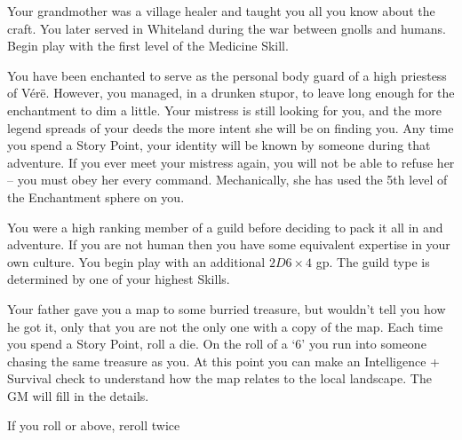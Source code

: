 \begin{multicols}{2}
\begin{list}{\addtocounter{list}{1}\textbf{:}}{\raggedleft}
\item{Your grandmother was a village healer and taught you all you know about the craft. You later served in Whiteland during the war between gnolls and humans.  Begin play with the first level of the Medicine Skill.}

\item{You have been enchanted to serve as the personal body guard of a high priestess of V\'{e}r\"{e}.  However, you managed, in a drunken stupor, to leave long enough for the enchantment to dim a little.  Your mistress is still looking for you, and the more legend spreads of your deeds the more intent she will be on finding you.  Any time you spend a Story Point, your identity will be known by someone during that adventure.  If you ever meet your mistress again, you will not be able to refuse her -- you must obey her every command.  Mechanically, she has used the 5th level of the Enchantment sphere on you.}

\item{You were a high ranking member of a guild before deciding to pack it all in and adventure.  If you are not human then you have some equivalent expertise in your own culture.  You begin play with an additional $2D6\times4$ gp.  The guild type is determined by one of your highest Skills.}

\item{Your father gave you a map to some burried treasure, but wouldn't tell you how he got it, only that you are not the only one with a copy of the map.  Each time you spend a Story Point, roll a die.  On the roll of a `6' you run into someone chasing the same treasure as you.  At this point you can make an Intelligence + Survival check to understand how the map relates to the local landscape.  The GM will fill in the details.}

\item{If you roll  or above, reroll twice}

\end{list}

\end{multicols}

